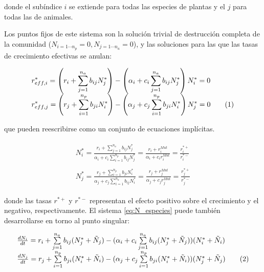 \noindent donde el subíndice $i$ se extiende para todas las especies de plantas y el $j$ para todas las de animales.

Los puntos fijos de este sistema son la solución trivial de destrucción completa de la comunidad ($N_{i=1\cdots n_{p}}=0, N_{j=1\cdots n_{a}}=0$), y las soluciones para las que las tasas de crecimiento efectivas se anulan: 

\begin{equation}
\begin{array}{lcr}
\displaystyle r^{*}_{eff,i} =\left(r_{i}+ \sum_{j=1}^{n_{a}} b_{ij}N^{*}_{j}\right)- \left(\alpha_{i}+c_{i}\sum_{j=1}^{n_{a}} b_{ij}N^{*}_j\right)N^{*}_{i}
=0 \nonumber\\
\displaystyle r^{*}_{eff,j} = \left(r_{j}+ \sum_{i=1}^{n_{p}} b_{ji}N^{*}_{i}\right)- \left(\alpha_{j}+c_{j}\sum_{i=1}^{n_{p}} b_{ji}N^{*}_i\right)N^{*}_{j} 
=0 
\stepcounter{equation}\tag{\theequation}\label{eq:effrateN}
\end{array}
\end{equation}

\noindent que pueden reescribirse como un conjunto de ecuaciones implícitas.

\begin{eqnarray}
\begin{array}{lcc}
  N^{*}_{i}=\frac{r_{i}+\sum_{j=1}^{n_{a}}b_{ij}N^{*}_{j}}{\alpha_{i}+c_{i}\sum_{i=1}^{n_{p}}b_{ij}N^{*}_{j}} = 
  \frac{r_{i}+r_{i}^{Mut}}{\alpha_{i}+c_{i}r_{i}^{Mut}} = 
  \frac{r_{i}^{*+}}{r_{i}^{*-}}  \nonumber\\
  \\
  N^{*}_{j}=\frac{r_{j}+\sum_{i=1}^{n_{p}}b_{ji}N^{*}_{i}}{\alpha_{j}+c_{j}\sum_{i=1}^{n_{a}}b_{ij}N^{*}_{i}} =
  \frac{r_{j}+r_{j}^{Mut}}{\alpha_{j}+c_{j}r_{j}^{Mut}} =
  \frac{r_{j}^{*+}}{r_{j}^{*-}}
  \end{array}
\end{eqnarray} 
 
\noindent donde las tasas $r^{*+}$ y $r^{*-}$ representan el efecto positivo sobre el crecimiento y el negativo, respectivamente. El sistema \ref{eq:N_especies} puede también desarrollarse en torno al punto singular:

\begin{equation}
\begin{array}{lcl}
\textstyle \frac{dN_{i}}{dt}=r_{i}+\sum\limits_{j=1}^{n_{a}}b_{ij}(N^{*}_{j}+\tilde{N}_{j})- (\alpha_{i}+c_{i}\sum\limits_{j=1}^{n_{a}}b_{ij}(N^{*}_j+\tilde{N}_{j}))(N^{*}_i+\tilde{N}_{i}) \nonumber\\
\textstyle \frac{dN_{j}}{dt}=r_{j}+\sum\limits_{i=1}^{n_{p}}b_{ji}(N^{*}_{i}+\tilde{N}_{i})-(\alpha_{j}+c_{j}\sum\limits_{i=1}^{n_{p}}b_{ji}(N^{*}_i+\tilde{N}_{i}))(N^{*}_j+\tilde{N}_{j}) 
\stepcounter{equation}\tag{\theequation}\label{eq:effrateTaylorN}
\end{array}
\end{equation}

